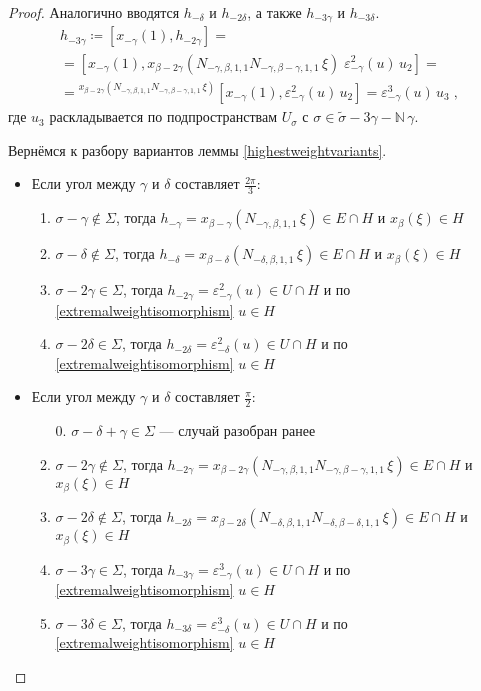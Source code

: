 \documentclass[10pt]{article}
\theoremstyle{break}
\theoremstyle{remark}
\newcommand{\N}{\mathbb{N}}
\begin{document}
\begin{proof}
Аналогично вводятся $h_{-\delta}$ и $h_{-2\delta}$, а также $h_{-3\gamma}$ и $h_{-3\delta}$.
\begin{multline*}
h_{-3\gamma} \coloneqq [x_{-\gamma}(1),h_{-2\gamma}] = \\ =
[x_{-\gamma}(1), x_{\beta-2\gamma}(N_{-\gamma,\beta,1,1} N_{-\gamma,\beta-\gamma,1,1} \, \xi) \; \varepsilon^2_{-\gamma}(u) \, u_2] = \\ =
{}^{x_{\beta-2\gamma}(N_{-\gamma,\beta,1,1} N_{-\gamma,\beta-\gamma,1,1} \, \xi)}[x_{-\gamma}(1),\varepsilon^2_{-\gamma}(u) \, u_2] =
\varepsilon^3_{-\gamma}(u) \, u_3
 \; ,
\end{multline*}
где $u_3$ раскладывается по подпространствам $U_\sigma$ с $\sigma \in \widetilde\sigma-3\gamma - \N \, \gamma$.

Вернёмся к разбору вариантов леммы \ref{highestweightvariants}.
\begin{itemize}
\item Если угол между $\gamma$ и $\delta$ составляет $\frac{2\pi}{3}$:
\begin{enumerate}
\item $ \sigma - \gamma \notin \Sigma$, тогда $h_{-\gamma}=x_{\beta-\gamma}(N_{-\gamma,\beta,1,1} \,\xi)\in E\cap H$ и $x_\beta(\xi)\in H$
\item $ \sigma - \delta \notin \Sigma$, тогда $h_{-\delta}=x_{\beta-\delta}(N_{-\delta,\beta,1,1} \,\xi)\in E\cap H$ и $x_\beta(\xi)\in H$
\item $ \sigma - 2\gamma \in \Sigma$, тогда $h_{-2\gamma}=\varepsilon_{-\gamma}^2(u)\in U\cap H$ и по \ref{extremalweightisomorphism} $u\in H$
\item $ \sigma - 2\delta \in \Sigma$, тогда $h_{-2\delta}=\varepsilon_{-\delta}^2(u)\in U\cap H$ и по \ref{extremalweightisomorphism} $u\in H$
\end{enumerate}
\item Если угол между $\gamma$ и $\delta$ составляет $\frac{\pi}{2}$:
\begin{enumerate}
\item[0.] $ \sigma - \delta + \gamma \in \Sigma$ --- случай разобран ранее
\item $ \sigma - 2\gamma \notin \Sigma$, тогда $h_{-2\gamma}=x_{\beta-2\gamma}(N_{-\gamma,\beta,1,1}N_{-\gamma,\beta-\gamma,1,1} \,\xi)\in E\cap H$ и $x_\beta(\xi)\in H$
\item $ \sigma - 2\delta \notin \Sigma$, тогда $h_{-2\delta}=x_{\beta-2\delta}(N_{-\delta,\beta,1,1}N_{-\delta,\beta-\delta,1,1} \,\xi)\in E\cap H$ и $x_\beta(\xi)\in H$
\item $ \sigma - 3\gamma \in \Sigma$, тогда $h_{-3\gamma}=\varepsilon_{-\gamma}^3(u)\in U\cap H$ и по \ref{extremalweightisomorphism} $u\in H$
\item $ \sigma - 3\delta \in \Sigma$, тогда $h_{-3\delta}=\varepsilon_{-\delta}^3(u)\in U\cap H$ и по \ref{extremalweightisomorphism} $u\in H$
\end{enumerate}
\end{itemize}
\end{proof}
\end{document}
